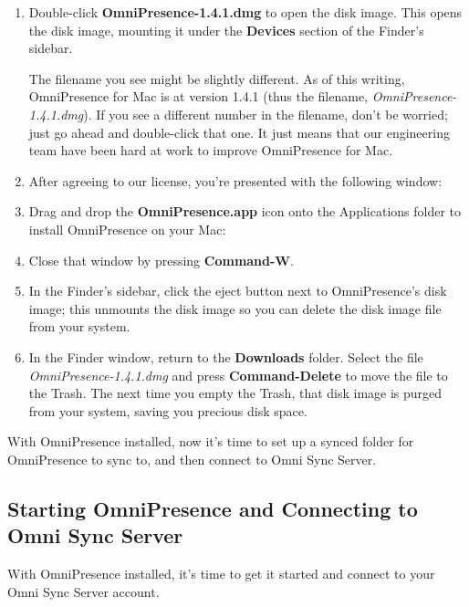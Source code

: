 \documentclass[../main.tex]{subfiles}
\begin{document}
\begin{enumerate}
  \item Double-click \textbf{OmniPresence-1.4.1.dmg} to open the disk image. This opens the disk
    image, mounting it under the \textbf{Devices} section of the Finder's sidebar.

    \begin{ognote}
      The filename you see might be slightly different. As of this writing, OmniPresence for Mac is
      at version 1.4.1 (thus the filename, \textit{OmniPresence-1.4.1.dmg}). If you see a
      different number in the filename, don't be worried; just go ahead and double-click that one.
      It just means that our engineering team have been hard at work to improve OmniPresence for
      Mac.
    \end{ognote}
  \item After agreeing to our license, you're presented with the following window:

  \item Drag and drop the \textbf{OmniPresence.app} icon onto the Applications folder to install
    OmniPresence on your Mac:

  \item Close that window by pressing \textbf{Command-W}.
  \item In the Finder's sidebar, click the eject button next to OmniPresence's disk image; this
    unmounts the disk image so you can delete the disk image file from your system.

  \item In the Finder window, return to the \textbf{Downloads} folder. Select the file
    \textit{OmniPresence-1.4.1.dmg} and press \textbf{Command-Delete} to move the file to the
    Trash. The next time you empty the Trash, that disk image is purged from your system, saving
    you precious disk space.
\end{enumerate}

With OmniPresence installed, now it's time to set up a synced folder for OmniPresence to sync
to, and then connect to Omni Sync Server.

\subsection{Starting OmniPresence and Connecting to Omni Sync Server}

With OmniPresence installed, it's time to get it started and connect to your Omni Sync Server
account.
\end{document}

